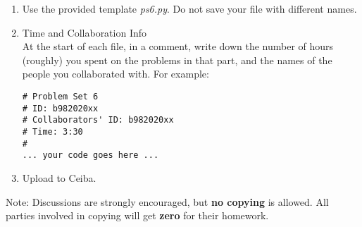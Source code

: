 \documentclass[12pt]{article}
\begin{document}
\begin{enumerate}
\item Use the provided template \textit{ps6.py}. 
 Do not  save your file with different names. 
\item Time and Collaboration Info \\
At the start of each file, in a comment, write down the number of hours (roughly) you spent on 
the problems in that part, and the names of the people you collaborated with. For example:
\begin{verbatim}
# Problem Set 6
# ID: b982020xx
# Collaborators' ID: b982020xx
# Time: 3:30
# 
... your code goes here ...
\end{verbatim}
\item Upload to Ceiba.
\end{enumerate}
Note: Discussions are strongly encouraged, but \textbf{no copying} is allowed. All parties involved in copying will get \textbf{zero} for their homework. 
\end{document}
